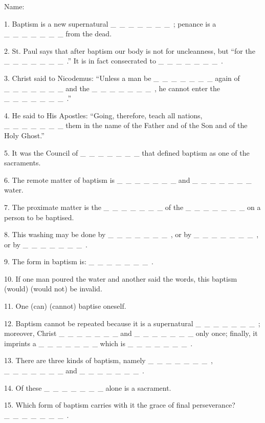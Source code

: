 \documentclass[a5paper]{article}
\title{}
\newcommand\textjarman[1]{{\jarman #1}}
\begin{document}
\setlength{\parskip}{6pt plus2pt minus2pt}


\noindent Name:



1. Baptism is a new supernatural  \_~\_~\_~\_~\_~\_~\_~; penance is a  \_~\_~\_~\_~\_~\_~\_  from the dead.

2. St. Paul says that after baptism our body is not for uncleanness, but “for the  \_~\_~\_~\_~\_~\_~\_~.” It is in fact consecrated to  \_~\_~\_~\_~\_~\_~\_~.

3. Christ said to Nicodemus: “Unless a man be  \_~\_~\_~\_~\_~\_~\_  again of  \_~\_~\_~\_~\_~\_~\_  and the  \_~\_~\_~\_~\_~\_~\_~, he cannot enter the  \_~\_~\_~\_~\_~\_~\_~.”

4. He said to His Apostles: “Going, therefore, teach all nations,  \_~\_~\_~\_~\_~\_~\_  them in the name of the Father and of the Son and of the Holy Ghost.”

5. It was the Council of  \_~\_~\_~\_~\_~\_~\_  that defined baptism as one of the sacraments.

6. The remote matter of baptism is  \_~\_~\_~\_~\_~\_~\_  and  \_~\_~\_~\_~\_~\_~\_  water.

7. The proximate matter is the  \_~\_~\_~\_~\_~\_~\_  of the  \_~\_~\_~\_~\_~\_~\_  on a person to be baptised.

8. This washing may be done by  \_~\_~\_~\_~\_~\_~\_~, or by  \_~\_~\_~\_~\_~\_~\_~, or by  \_~\_~\_~\_~\_~\_~\_~.

9. The form in baptism is:  \_~\_~\_~\_~\_~\_~\_~.

10. If one man poured the water and another said the words, this baptism (\textjarman{would}) (\textjarman{would not}) be invalid.

11. One (\textjarman{can}) (\textjarman{cannot}) baptise oneself.

12. Baptism cannot be repeated because it is a supernatural  \_~\_~\_~\_~\_~\_~\_~; moreover, Christ  \_~\_~\_~\_~\_~\_~\_  and  \_~\_~\_~\_~\_~\_~\_  only once; finally, it imprints a  \_~\_~\_~\_~\_~\_~\_  which is  \_~\_~\_~\_~\_~\_~\_~.

13. There are three kinds of baptism, namely  \_~\_~\_~\_~\_~\_~\_~,  \_~\_~\_~\_~\_~\_~\_  and  \_~\_~\_~\_~\_~\_~\_~.

14. Of these  \_~\_~\_~\_~\_~\_~\_  alone is a sacrament.

15. Which form of baptism carries with it the grace of final perseverance?  \_~\_~\_~\_~\_~\_~\_~.
\end{document}
